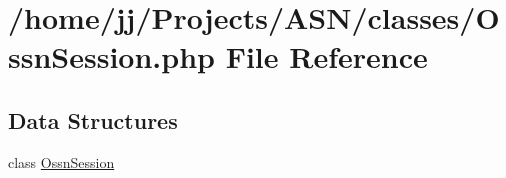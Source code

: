 \hypertarget{_ossn_session_8php}{}\section{/home/jj/\+Projects/\+A\+S\+N/classes/\+Ossn\+Session.php File Reference}
\label{_ossn_session_8php}
\subsection*{Data Structures}
\begin{DoxyCompactItemize}
\item 
class \hyperlink{class_ossn_session}{Ossn\+Session}
\end{DoxyCompactItemize}

